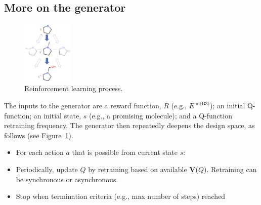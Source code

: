 \documentclass[10pt]{article}
\begin{document}
\subsection{More on the generator}

\begin{figure}
\vspace{-2ex}
  \centering
  \includegraphics[width=0.22\textwidth,trim=0in 0in 0in 0in,clip]{./Figs/rl.png}
  \vspace{-4ex}
  \caption{Reinforcement learning process.
\label{fig:rl}}
\end{figure}

The inputs to the generator are a reward function, $R$ (e.g., $E^{\textrm{ml(B3)}}$); an initial Q-function; an initial state, $s$ (e.g., a promising molecule); and a Q-function
retraining frequency. 
The generator then repeatedly deepens the design space, as follows (see Figure~\ref{fig:rl}).

\begin{itemize}\itemsep-0.2em 
\item
For each action $a$ that is possible from current state $s$:
\item
Periodically, update $Q$ by retraining based on available \textbf{V}($Q$). Retraining can be synchronous or asynchronous.
\item
Stop when termination criteria (e.g., max number of steps) reached
\end{itemize}
\end{document}
